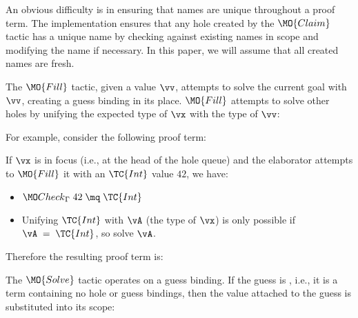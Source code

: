 An obvious difficulty is in ensuring that names are unique throughout a proof term.
The implementation ensures that any hole created by the $\MO{Claim}$ tactic
has a unique name by checking against existing names in scope and modifying
the name if necessary. In this paper, we will assume that all created names are fresh.

The $\MO{Fill}$ tactic, given a value $\vv$, attempts to solve the current goal
with $\vv$, creating a guess binding in its place. $\MO{Fill}$ attempts to
solve other holes by unifying the expected type of $\vx$ with the type of $\vv$:


\noindent
For example, consider the following proof term:

\DM{
\AR{
\hole{\vA}{\Type}\SC\hole{\vk}{\Nat}\SC
\hole{\vx}{\vA}\SC\hole{\vxs}{\Vect\;\vA\;\vk}\SC
\\
\hole{\vys}{\Vect\;\vA\;(\suc\;\vk)}\SC\vys
}
}

\noindent
If $\vx$ is in focus (i.e., at the head of the hole queue) and the elaborator
attempts to
$\MO{Fill}$ it with an $\TC{Int}$ value $42$, we have:

\begin{itemize}
\item $\Check\;42\;\mq\;\TC{Int}$
\item Unifying $\TC{Int}$ with $\vA$ (the type of $\vx$) is only possible if
$\vA\;=\;\TC{Int}$, so solve $\vA$.
\end{itemize}

\noindent
Therefore the resulting proof term is:


The $\MO{Solve}$ tactic operates on a guess binding. If the guess is , i.e., it
is a \TT{} term containing no hole or guess bindings, then the value attached to
the guess is substituted into its scope:


